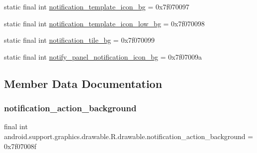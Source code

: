 \begin{DoxyCompactItemize}
\item 
static final int \mbox{\hyperlink{classandroid_1_1support_1_1graphics_1_1drawable_1_1R_1_1drawable_a3a1f9adebded4090513d2adfad776b00}{notification\+\_\+template\+\_\+icon\+\_\+bg}} = 0x7f070097
\item 
static final int \mbox{\hyperlink{classandroid_1_1support_1_1graphics_1_1drawable_1_1R_1_1drawable_aa043c18192131873dfb9e8726226b99a}{notification\+\_\+template\+\_\+icon\+\_\+low\+\_\+bg}} = 0x7f070098
\item 
static final int \mbox{\hyperlink{classandroid_1_1support_1_1graphics_1_1drawable_1_1R_1_1drawable_ad7bb393526fbabc1f476d1ba3e4c8e32}{notification\+\_\+tile\+\_\+bg}} = 0x7f070099
\item 
static final int \mbox{\hyperlink{classandroid_1_1support_1_1graphics_1_1drawable_1_1R_1_1drawable_a68192417427687e55d351e38d84bb5d4}{notify\+\_\+panel\+\_\+notification\+\_\+icon\+\_\+bg}} = 0x7f07009a
\end{DoxyCompactItemize}


\subsection{Member Data Documentation}
\mbox{\label{classandroid_1_1support_1_1graphics_1_1drawable_1_1R_1_1drawable_a406ec3cf68ebdc6af7c204f382d49b19}} 
\subsubsection{\texorpdfstring{notification\+\_\+action\+\_\+background}{notification\_action\_background}}
{\footnotesize\ttfamily final int android.\+support.\+graphics.\+drawable.\+R.\+drawable.\+notification\+\_\+action\+\_\+background = 0x7f07008f\hspace{0.3cm}{\ttfamily [static]}}

\mbox{\label{classandroid_1_1support_1_1graphics_1_1drawable_1_1R_1_1drawable_af5fd5e375a2f7e28740270ae167381fd}} 
